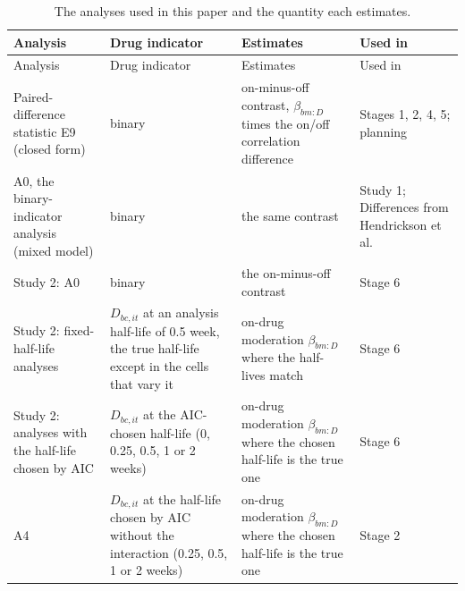 \documentclass[
  11pt,
]{article}
\begin{document}
\begin{longtable}[]{@{}
  >{\raggedright\arraybackslash}p{}
  >{\raggedright\arraybackslash}p{}
  >{\raggedright\arraybackslash}p{}
  >{\raggedright\arraybackslash}p{}@{}}
\caption{\label{tab:estimands} The analyses used in this paper and the quantity each estimates.}\tabularnewline
\toprule\noalign{}
\begin{minipage}[b]{\linewidth}\raggedright
Analysis
\end{minipage} & \begin{minipage}[b]{\linewidth}\raggedright
Drug indicator
\end{minipage} & \begin{minipage}[b]{\linewidth}\raggedright
Estimates
\end{minipage} & \begin{minipage}[b]{\linewidth}\raggedright
Used in
\end{minipage} \\
\midrule\noalign{}
\endfirsthead
\toprule\noalign{}
\begin{minipage}[b]{\linewidth}\raggedright
Analysis
\end{minipage} & \begin{minipage}[b]{\linewidth}\raggedright
Drug indicator
\end{minipage} & \begin{minipage}[b]{\linewidth}\raggedright
Estimates
\end{minipage} & \begin{minipage}[b]{\linewidth}\raggedright
Used in
\end{minipage} \\
\midrule\noalign{}
\endhead
\bottomrule\noalign{}
\endlastfoot
Paired-difference statistic E9 (closed form) & binary & on-minus-off contrast, \(\beta_{bm:D}\) times the on/off correlation difference & Stages 1, 2, 4, 5; planning \\
A0, the binary-indicator analysis (mixed model) & binary & the same contrast & Study 1; Differences from Hendrickson et al. \\
Study 2: A0 & binary & the on-minus-off contrast & Stage 6 \\
Study 2: fixed-half-life analyses & \(D_{bc,it}\) at an analysis half-life of 0.5 week, the true half-life except in the cells that vary it & on-drug moderation \(\beta_{bm:D}\) where the half-lives match & Stage 6 \\
Study 2: analyses with the half-life chosen by AIC & \(D_{bc,it}\) at the AIC-chosen half-life (0, 0.25, 0.5, 1 or 2 weeks) & on-drug moderation \(\beta_{bm:D}\) where the chosen half-life is the true one & Stage 6 \\
A4 & \(D_{bc,it}\) at the half-life chosen by AIC without the interaction (0.25, 0.5, 1 or 2 weeks) & on-drug moderation \(\beta_{bm:D}\) where the chosen half-life is the true one & Stage 2 \\
\end{longtable}
\end{document}
